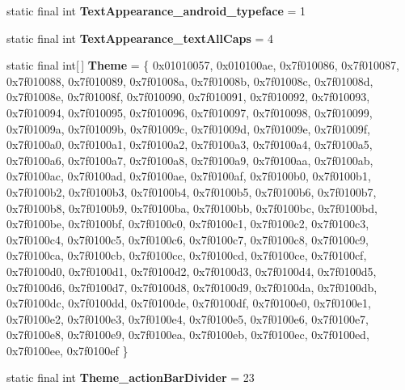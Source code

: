 \begin{DoxyCompactItemize}
\item 
\hypertarget{classandroid_1_1support_1_1v7_1_1appcompat_1_1_r_1_1styleable_a85b8be9cd5f70a43e5fd407b3048916e}{}static final int {\bfseries Text\+Appearance\+\_\+android\+\_\+typeface} = 1\label{classandroid_1_1support_1_1v7_1_1appcompat_1_1_r_1_1styleable_a85b8be9cd5f70a43e5fd407b3048916e}

\item 
\hypertarget{classandroid_1_1support_1_1v7_1_1appcompat_1_1_r_1_1styleable_af8c701cb6175c8b9e88e66d3cd60ed12}{}static final int {\bfseries Text\+Appearance\+\_\+text\+All\+Caps} = 4\label{classandroid_1_1support_1_1v7_1_1appcompat_1_1_r_1_1styleable_af8c701cb6175c8b9e88e66d3cd60ed12}

\item 
\hypertarget{classandroid_1_1support_1_1v7_1_1appcompat_1_1_r_1_1styleable_a0c7dbd78d169a943906ea49719c93335}{}static final int\mbox{[}$\,$\mbox{]} {\bfseries Theme} = \{ 0x01010057, 0x010100ae, 0x7f010086, 0x7f010087, 0x7f010088, 0x7f010089, 0x7f01008a, 0x7f01008b, 0x7f01008c, 0x7f01008d, 0x7f01008e, 0x7f01008f, 0x7f010090, 0x7f010091, 0x7f010092, 0x7f010093, 0x7f010094, 0x7f010095, 0x7f010096, 0x7f010097, 0x7f010098, 0x7f010099, 0x7f01009a, 0x7f01009b, 0x7f01009c, 0x7f01009d, 0x7f01009e, 0x7f01009f, 0x7f0100a0, 0x7f0100a1, 0x7f0100a2, 0x7f0100a3, 0x7f0100a4, 0x7f0100a5, 0x7f0100a6, 0x7f0100a7, 0x7f0100a8, 0x7f0100a9, 0x7f0100aa, 0x7f0100ab, 0x7f0100ac, 0x7f0100ad, 0x7f0100ae, 0x7f0100af, 0x7f0100b0, 0x7f0100b1, 0x7f0100b2, 0x7f0100b3, 0x7f0100b4, 0x7f0100b5, 0x7f0100b6, 0x7f0100b7, 0x7f0100b8, 0x7f0100b9, 0x7f0100ba, 0x7f0100bb, 0x7f0100bc, 0x7f0100bd, 0x7f0100be, 0x7f0100bf, 0x7f0100c0, 0x7f0100c1, 0x7f0100c2, 0x7f0100c3, 0x7f0100c4, 0x7f0100c5, 0x7f0100c6, 0x7f0100c7, 0x7f0100c8, 0x7f0100c9, 0x7f0100ca, 0x7f0100cb, 0x7f0100cc, 0x7f0100cd, 0x7f0100ce, 0x7f0100cf, 0x7f0100d0, 0x7f0100d1, 0x7f0100d2, 0x7f0100d3, 0x7f0100d4, 0x7f0100d5, 0x7f0100d6, 0x7f0100d7, 0x7f0100d8, 0x7f0100d9, 0x7f0100da, 0x7f0100db, 0x7f0100dc, 0x7f0100dd, 0x7f0100de, 0x7f0100df, 0x7f0100e0, 0x7f0100e1, 0x7f0100e2, 0x7f0100e3, 0x7f0100e4, 0x7f0100e5, 0x7f0100e6, 0x7f0100e7, 0x7f0100e8, 0x7f0100e9, 0x7f0100ea, 0x7f0100eb, 0x7f0100ec, 0x7f0100ed, 0x7f0100ee, 0x7f0100ef \}\label{classandroid_1_1support_1_1v7_1_1appcompat_1_1_r_1_1styleable_a0c7dbd78d169a943906ea49719c93335}

\item 
\hypertarget{classandroid_1_1support_1_1v7_1_1appcompat_1_1_r_1_1styleable_a7670a9e3d1dec4ed0c2c9f6b50cdd7a2}{}static final int {\bfseries Theme\+\_\+action\+Bar\+Divider} = 23\label{classandroid_1_1support_1_1v7_1_1appcompat_1_1_r_1_1styleable_a7670a9e3d1dec4ed0c2c9f6b50cdd7a2}


\end{DoxyCompactItemize}
